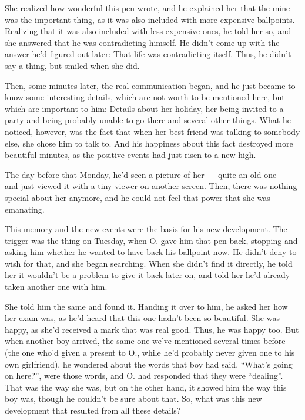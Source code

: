 She realized how wonderful this pen wrote, and he explained her that the mine was the important thing, as it was also included with more expensive ballpoints. Realizing that it was also included with less expensive ones, he told her so, and she answered that he was contradicting himself. He didn't come up with the answer he'd figured out later: That life was contradicting itself. Thus, he didn't say a thing, but smiled when she did.

Then, some minutes later, the real communication began, and he just became to know some interesting details, which are not worth to be mentioned here, but which are important to him: Details about her holiday, her being invited to a party and being probably unable to go there and several other things. What he noticed, however, was the fact that when her best friend was talking to somebody else, she chose him to talk to. And his happiness about this fact destroyed more beautiful minutes, as the positive events had just risen to a new high.

The day before that Monday, he'd seen a picture of her --- quite an old one --- and just viewed it with a tiny viewer on another screen. Then, there was nothing special about her anymore, and he could not feel that power that she was emanating.

This memory and the new events were the basis for his new development. The trigger was the thing on Tuesday, when O. gave him that pen back, stopping and asking him whether he wanted to have back his ballpoint now. He didn't deny to wish for that, and she began searching. When she didn't find it directly, he told her it wouldn't be a problem to give it back later on, and told her he'd already taken another one with him.

She told him the same and found it. Handing it over to him, he asked her how her exam was, as he'd heard that this one hadn't been so beautiful. She was happy, as she'd received a mark that was real good. 
Thus, he was happy too. But when another boy arrived, the same one we've mentioned several times before (the one who'd given a present to O., while he'd probably never given one to his own girlfriend), he wondered about the words that boy had said. \enquote{What's going on here?}, were those words, and O. had responded that they were \enquote{dealing}. 
That was the way she was, but on the other hand, it showed him the way this boy was, though he couldn't be sure about that. 
So, what was this new development that resulted from all these details?

